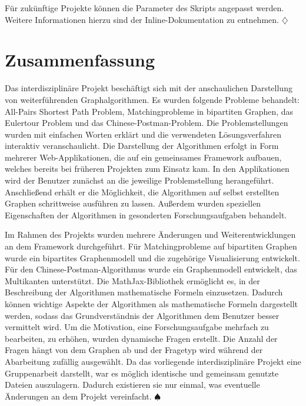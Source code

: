 Für zukünftige Projekte können die Parameter des Skripts angepasst werden. Weitere Informationen hierzu sind der Inline-Dokumentation zu entnehmen. \hfill$\diamondsuit$

\chapter{Zusammenfassung} %
Das interdisziplinäre Projekt beschäftigt sich mit der anschaulichen Darstellung von weiterführenden Graphalgorithmen. Es wurden folgende Probleme behandelt: All-Pairs Shortest Path Problem, Matchingprobleme in bipartiten Graphen, das Eulertour Problem und das Chinese-Postman-Problem. 
Die Problemstellungen wurden mit einfachen Worten erklärt und die verwendeten Lösungsverfahren interaktiv veranschaulicht. Die Darstellung der Algorithmen erfolgt in Form mehrerer Web-Applikationen, die auf ein gemeinsames Framework aufbauen, welches bereits bei früheren Projekten zum Einsatz kam. In den Applikationen wird der Benutzer zunächst an die jeweilige Problemstellung herangeführt. Anschließend erhält er die Möglichkeit, die Algorithmen auf selbst erstellten Graphen schrittweise ausführen zu lassen. Außerdem wurden speziellen Eigenschaften der Algorithmen in gesonderten Forschungsaufgaben behandelt. 

Im Rahmen des Projekts wurden mehrere Änderungen und Weiterentwicklungen an dem Framework durchgeführt. Für Matchingprobleme auf bipartiten Graphen wurde ein bipartites Graphenmodell und die zugehörige Visualisierung entwickelt. Für den Chinese-Postman-Algorithmus wurde ein Graphenmodell entwickelt, das Multikanten unterstützt. 
Die MathJax-Bibliothek ermöglicht es, in der Beschreibung der Algorithmen mathematische Formeln einzusetzen. Dadurch können wichtige Aspekte der Algorithmen als mathematische Formeln dargestellt werden, sodass das Grundverständnis der Algorithmen dem Benutzer besser vermittelt wird.
Um die Motivation, eine Forschungsaufgabe mehrfach zu bearbeiten, zu erhöhen, wurden dynamische Fragen erstellt. Die Anzahl der Fragen hängt von dem Graphen ab und der Fragetyp wird während der Abarbeitung zufällig ausgewählt. Da das vorliegende interdisziplinäre Projekt eine Gruppenarbeit darstellt, war es möglich identische und gemeinsam genutzte Dateien auszulagern. Dadurch existieren sie nur einmal, was eventuelle Änderungen an dem Projekt vereinfacht. \hfill$\spadesuit$
